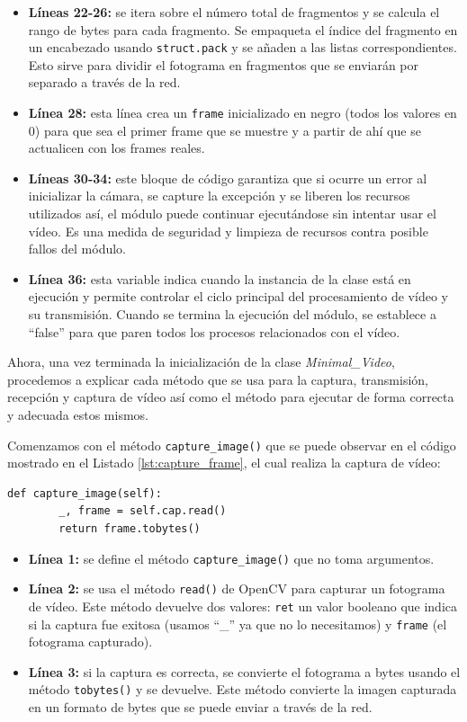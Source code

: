 \begin{itemize}
    \item \textbf{Líneas 22-26:} se itera sobre el número total de fragmentos y se calcula el rango de bytes para cada fragmento. Se empaqueta el índice del fragmento en un encabezado usando \texttt{struct.pack} y se añaden a las listas correspondientes. Esto sirve para dividir el fotograma en fragmentos que se enviarán por separado a través de la red.
    \item \textbf{Línea 28:} esta línea crea un \texttt{frame} inicializado en negro (todos los valores en 0) para que sea el primer frame que se muestre y a partir de ahí que se actualicen con los frames reales.
    \item \textbf{Líneas 30-34:} este bloque de código garantiza que si ocurre un error al inicializar la cámara, se capture la excepción y se liberen los recursos utilizados así, el módulo puede continuar ejecutándose sin intentar usar el vídeo. Es una medida de seguridad y limpieza de recursos contra posible fallos del módulo.
    \item \textbf{Línea 36:} esta variable indica cuando la instancia de la clase está en ejecución y permite controlar el ciclo principal del procesamiento de vídeo y su transmisión. Cuando se termina la ejecución del módulo, se establece a ``false'' para que paren todos los procesos relacionados con el vídeo.
\end{itemize}

Ahora, una vez terminada la inicialización de la clase \textit{Minimal\_Video}, procedemos a explicar cada método que se usa para la captura, transmisión, recepción y captura de vídeo así como el método para ejecutar de forma correcta y adecuada estos mismos.
\vspace{\baselineskip}

Comenzamos con el método \texttt{capture\_image()} que se puede observar en el código mostrado en el Listado \ref{lst:capture_frame}, el cual realiza la captura de vídeo:
\begin{lstlisting}[style=pythonstyle, caption={Método \texttt{capture\_frame()} de \textit{Minimal\_Video}.}, label={lst:capture_frame}]
def capture_image(self):
        _, frame = self.cap.read()
        return frame.tobytes()
\end{lstlisting}

\begin{itemize}
    \item \textbf{Línea 1:} se define el método \texttt{capture\_image()} que no toma argumentos.
    \item \textbf{Línea 2:} se usa el método \texttt{read()} de OpenCV para capturar un fotograma de vídeo. Este método devuelve dos valores: \texttt{ret} un valor booleano que indica si la captura fue exitosa (usamos ``\_'' ya que no lo necesitamos) y \texttt{frame} (el fotograma capturado).
    \item \textbf{Línea 3:} si la captura es correcta, se convierte el fotograma a bytes usando el método \texttt{tobytes()} y se devuelve. Este método convierte la imagen capturada en un formato de bytes que se puede enviar a través de la red.
\end{itemize}
\vspace{\baselineskip}

